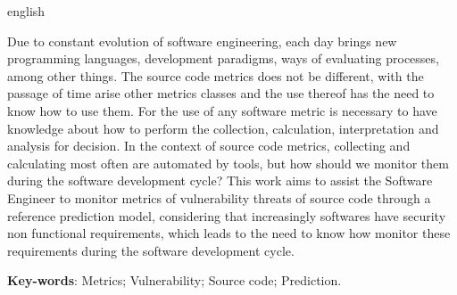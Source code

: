 \begin{resumo}[Abstract]
 \begin{otherlanguage*}{english}

Due to constant evolution of software engineering, each day brings new
programming languages, development paradigms, ways of evaluating processes,
among other things. The source code metrics does not be different, with
the passage of time arise other metrics classes and the use thereof has the
need to know how to use them. For the use of any software metric is necessary
to have knowledge about how to perform the collection, calculation,
interpretation and analysis for decision. In the context of source
code metrics, collecting and calculating most often are automated by tools, but
how should we monitor them during the software development cycle? This work
aims to assist the Software Engineer to monitor metrics of vulnerability
threats of source code through a reference prediction model, considering that
increasingly softwares have security non functional requirements, which leads
to the need to know how monitor these requirements during the software
development cycle.

   \vspace{\onelineskip}
 
   \noindent 
   \textbf{Key-words}: Metrics; Vulnerability; Source code; Prediction.
 \end{otherlanguage*}
\end{resumo}
